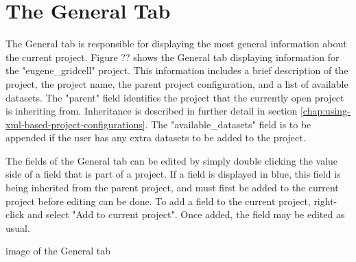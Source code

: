 \chapter{The General Tab}

The General tab is responsible for displaying the most general information about the current project.  Figure ?? shows the General tab displaying information for the "eugene\_gridcell" project.  This information includes a brief description of the project, the project name, the parent project configuration, and a list of available datasets.  The "parent" field identifies the project that the currently open project is inheriting from.  Inheritance is described in further detail in section \ref{chap:using-xml-based-project-configurations}.  The "available\_datasets" field is to be appended if the user has any extra datasets to be added to the project.

The fields of the General tab can be edited by simply double clicking the value side of a field that is part of a project.  If a field is displayed in blue, this field is being inherited from the parent project, and must first be added to the current project before editing can be done. To add a field to the current project, right-click and select "Add to current project".  Once added, the field may be edited as usual.

image of the General tab
